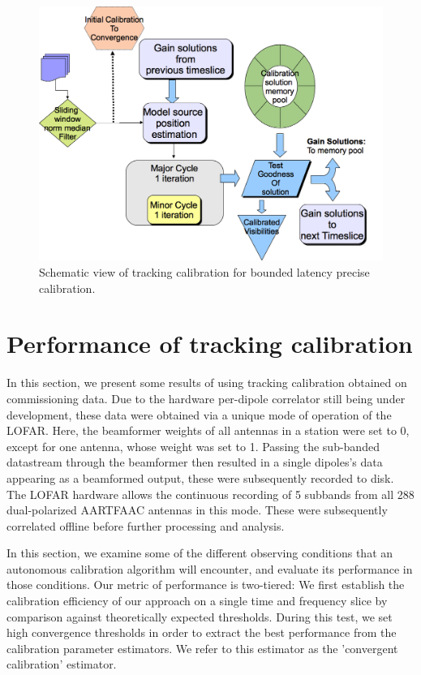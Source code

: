 \documentclass{aa}
\begin{document}
\begin{figure}[tbh]
\includegraphics[width=1\columnwidth]{Figs/tracking_cal_schematic}

\caption{\label{fig:trackcalSchematic}Schematic view of tracking calibration
for bounded latency precise calibration.}
\end{figure}





\section{\label{sec:Performance-of-tracking}Performance of tracking calibration}

In this section, we present some results of using tracking calibration
obtained on commissioning data. Due to the hardware per-dipole correlator
still being under development, these data were obtained via a unique
mode of operation of the LOFAR. Here, the beamformer weights of all
antennas in a station were set to 0, except for one antenna, whose
weight was set to 1. Passing the sub-banded datastream through the
beamformer then resulted in a single dipoles's data appearing as a
beamformed output, these were subsequently recorded to disk. The LOFAR
hardware allows the continuous recording of 5 subbands from all 288
dual-polarized AARTFAAC antennas in this mode. These were subsequently
correlated offline before further processing and analysis.

In this section, we examine some of the different observing conditions
that an autonomous calibration algorithm will encounter, and evaluate
its performance in those conditions. Our metric of performance is
two-tiered: We first establish the calibration efficiency of our approach
on a single time and frequency slice by comparison against theoretically
expected thresholds. During this test, we set high convergence thresholds
in order to extract the best performance from the calibration parameter
estimators. We refer to this estimator as the 'convergent calibration'
estimator.
\end{document}
